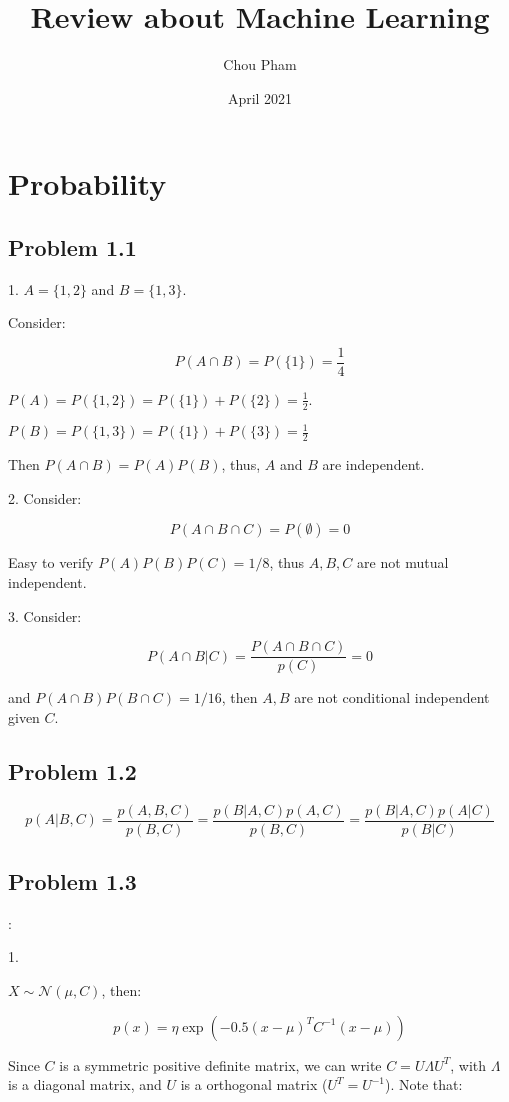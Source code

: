 \documentclass{article}
\title{Review about Machine Learning}
\author{Chou Pham}
\date{April 2021}
\begin{document}
\maketitle
\section{Probability}

\subsection{Problem 1.1}

1. $A=\{1,2\}$ and $B=\{1,3\}$.

Consider:

$$
P(A\cap B) = P(\{1\}) =\frac{1}{4}
$$

$P(A)=P(\{1,2\})=P(\{1\})+P(\{2\})=\frac{1}{2}$.

$P(B)=P(\{1,3\})=P(\{1\})+P(\{3\})=\frac{1}{2}$

Then $P(A\cap B)=P(A)P(B)$, thus, $A$ and $B$ are independent.

2. Consider:

$$
P(A\cap B\cap C)=P(\emptyset)=0
$$

Easy to verify $P(A)P(B)P(C)=1/8$, thus $A,B,C$ are not mutual independent.

3. Consider:

$$
P(A\cap B|C) = \frac{P(A\cap B\cap C)}{p(C)} = 0
$$

and $P(A\cap B)P(B\cap C)=1/16$, then $A,B$ are not conditional independent given $C$.

\subsection{Problem 1.2}
$$
p(A|B,C)=\frac{p(A,B,C)}{p(B,C)}=\frac{p(B|A,C)p(A,C)}{p(B,C)}=\frac{p(B|A,C)p(A|C)}{p(B|C)}
$$

\subsection{Problem 1.3}:

1.

$X\sim \mathcal{N}(\mu,C)$, then:

\begin{equation}\label{eq1}
    p(x) = \eta\exp(-0.5(x-\mu)^TC^{-1}(x-\mu))
\end{equation}

Since $C$ is a symmetric positive definite matrix, we can write $C=U\Lambda U^T$, with $\Lambda$
is a diagonal matrix, and $U$ is a orthogonal matrix ($U^T=U^{-1}$). Note that:
\end{document}
